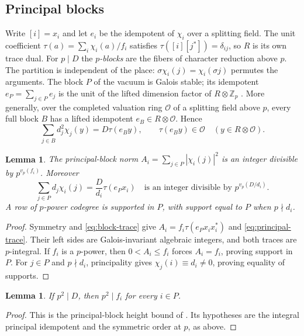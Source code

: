 \documentclass[11pt]{amsart}
\numberwithin{equation}{section}
\newtheorem{lemma}[theorem]{Lemma}
\theoremstyle{definition}
\theoremstyle{plain}
\newcommand{\ZZ}{\mathbb Z}
\begin{document}
\subsection{Principal blocks}\label{blk:principal}
Write $[i]=x_i$ and let $e_i$ be the idempotent of $\chi_i$ over a
splitting field. The unit coefficient $\tau(a)=\sum_i\chi_i(a)/f_i$
satisfies $\tau([i][j^*])=\delta_{ij}$, so $R$ is its own trace dual.
For $p\mid D$ the \emph{$p$-blocks} are the fibers of character
reduction above $p$. The partition is independent of the place:
$\sigma\chi_i(j)=\chi_i(\sigma j)$ permutes the arguments. The block
$P$ of the vacuum is Galois stable; its idempotent $e_P=\sum_{j\in P}e_j$
is the unit of the lifted dimension factor of $R\otimes\ZZ_p$
\cite[Tag 04GH]{Stacks}. More generally, over the completed valuation
ring $\mathcal O$ of a splitting field above $p$, every full block $B$
has a lifted idempotent $e_B\in R\otimes\mathcal O$. Hence
\begin{equation}\label{eq:block-trace}
 \sum_{j\in B}d_j^2\chi_j(y)=D\tau(e_By),\qquad
 \tau(e_By)\in\mathcal O\quad(y\in R\otimes\mathcal O).
\end{equation}

\begin{lemma}\label{blk:support}
The principal-block norm $A_i=\sum_{j\in P}|\chi_i(j)|^2$ is an
integer divisible by $p^{v_p(f_i)}$. Moreover
\begin{equation}\label{eq:principal-trace}
 \sum_{j\in P}d_j\chi_i(j)=\frac D{d_i}\tau(e_Px_i)
 \quad\text{is an integer divisible by }p^{v_p(D/d_i)}.
\end{equation}
A row of $p$-power codegree is supported in $P$, with support equal
to $P$ when $p\nmid d_i$.
\end{lemma}
\begin{proof}
Symmetry and \eqref{eq:block-trace} give
$A_i=f_i\tau(e_Px_ix_i^*)$ and \eqref{eq:principal-trace}.
Their left sides are Galois-invariant algebraic integers, and both
traces are $p$-integral. If $f_i$ is a $p$-power, then
$0<A_i\le f_i$ forces $A_i=f_i$, proving support in $P$.
For $j\in P$ and $p\nmid d_i$, principality gives
$\chi_j(i)\equiv d_i\ne0$, proving equality of supports.
\end{proof}

\begin{lemma}\label{blk:height}
If $p^2\mid D$, then $p^2\mid f_i$ for every $i\in P$.
\end{lemma}
\begin{proof}
This is the principal-block height bound of
\cite[Corollary~4.1]{BDPcore}. Its hypotheses are the integral
principal idempotent and the symmetric order at $p$, as above.
\end{proof}
\end{document}
